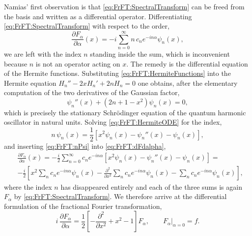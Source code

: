 			Namias' first observation is that \eqref{eq:FrFT:SpectralTransform} can be freed from the basis and written as a differential operator. Differentiating \eqref{eq:FrFT:SpectralTransform} with respect to the order,
			\begin{equation}\label{eq:FrFT:dFdalpha}
				\frac{\partial F_{\alpha}}{\partial \alpha}(x) = -i\sum_{n=0}^{\infty}n\,c_{n}e^{-in\alpha}\psi_{n}(x),
			\end{equation}
			we are left with the index $n$ standing inside the sum, which is inconvenient because $n$ is not an operator acting on $x$. The remedy is the differential equation of the Hermite functions. Substituting \eqref{eq:FrFT:HermiteFunctions} into the Hermite equation $H_{n}'' - 2xH_{n}' + 2nH_{n} = 0$ one obtains, after the elementary computation of the two derivatives of the Gaussian factor,
			\begin{equation}\label{eq:FrFT:HermiteODE}
				\psi_{n}''(x) + \left(2n+1-x^{2}\right)\psi_{n}(x) = 0,
			\end{equation}
			which is precisely the stationary Schr\"odinger equation of the quantum harmonic oscillator in natural units. Solving \eqref{eq:FrFT:HermiteODE} for the index,
			\begin{equation}\label{eq:FrFT:nPsi}
				n\,\psi_{n}(x) = \frac{1}{2}\left[x^{2}\psi_{n}(x) - \psi_{n}''(x) - \psi_{n}(x)\right],
			\end{equation}
			and inserting \eqref{eq:FrFT:nPsi} into \eqref{eq:FrFT:dFdalpha},
			\begin{align*}
				& \frac{\partial F_{\alpha}}{\partial \alpha}(x) = -\frac{i}{2}\sum_{n=0}^{\infty}c_{n}e^{-in\alpha}\left[x^{2}\psi_{n}(x) - \psi_{n}''(x) - \psi_{n}(x)\right] = \\
				& -\frac{i}{2}\left[x^{2}\sum_{n}c_{n}e^{-in\alpha}\psi_{n}(x) - \frac{\partial^{2}}{\partial x^{2}}\sum_{n}c_{n}e^{-in\alpha}\psi_{n}(x) - \sum_{n}c_{n}e^{-in\alpha}\psi_{n}(x)\right],
			\end{align*}
			where the index $n$ has disappeared entirely and each of the three sums is again $F_{\alpha}$ by \eqref{eq:FrFT:SpectralTransform}. We therefore arrive at the differential formulation of the fractional Fourier transformation,
			\begin{equation}\label{eq:FrFT:PDE}
				i\,\frac{\partial F_{\alpha}}{\partial \alpha} = \frac{1}{2}\left[-\frac{\partial^{2}}{\partial x^{2}} + x^{2} - 1\right]F_{\alpha}, \qquad F_{\alpha}\big|_{\alpha=0} = f.
			\end{equation}

